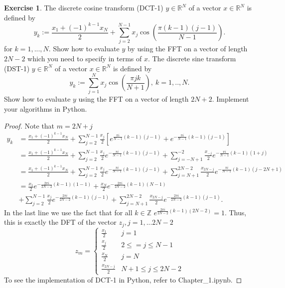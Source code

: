 \documentclass{amsart}
\theoremstyle{plain}
\theoremstyle{definition}
\newtheorem{exer}{Exercise}[section]
\newcommand{\R}{\mathbb{R}}
\newcommand{\Z}{\mathbb{Z}}
\begin{document}
\begin{exer}
    The discrete cosine transform (DCT-1) $y\in \R^N$ of a vector $x \in \R^N$ is defined by
    $$y_k := \frac{x_1 + \left(-1\right)^{k-1}x_N}{2} + \sum_{j=2}^{N-1} x_j \cos\left(\frac{\pi(k-1)(j-1)}{N-1}\right).$$
    for $k=1,...,N$. Show how to evaluate $y$ by using the FFT on a vector of length $2N-2$ which you need to specify in terms of $x$.
     The discrete sine transform (DST-1) $y\in \R^N$ of a vector $x \in \R^N$ is defined by
     $$y_k := \sum_{j=1}^{N} x_j \cos\left(\frac{\pi jk}{N+1}\right), \ k=1,..,N.$$
     Show how to evaluate $y$ using the FFT on a vector of length $2N+2$. Implement your algorithms in Python. 
\end{exer}
\begin{proof}
    Note that 
    $m=2N+j$
    \begin{align*}
        y_k &= \frac{x_1 + \left(-1\right)^{k-1}x_N}{2} + \sum_{j=2}^{N-1} \frac{x_j}{2}\left[e^{\frac{\pi i }{N-1}(k-1) (j-1) } +e^{-\frac{\pi i }{N-1}(k-1) (j-1) }\right]\\
        &= \frac{x_1 + \left(-1\right)^{k-1}x_N}{2}+ \sum_{j=2}^{N-1} \frac{x_j}{2}e^{-\frac{\pi i }{N-1}(k-1) (j-1) }+ \sum_{j=-N+1}^{-2}\frac{x_{-j}}{2}e^{-\frac{\pi i }{N-1}(k-1) (1+j) }\\
        &= \frac{x_1 + \left(-1\right)^{k-1}x_N}{2}+\sum_{j=2}^{N-1} \frac{x_j}{2}e^{-\frac{\pi i }{N-1}(k-1) (j-1) } + \sum_{j=N+1}^{2N-2}\frac{x_{2N-j}}{2}e^{-\frac{\pi i }{N-1}(k-1) (j-2N+1) } \\
        &=\frac{x_1}{2}e^{-\frac{2\pi i }{2N-2}(k-1) (1-1) }+ \frac{x_N}{2}e^{-\frac{2\pi i }{2N-2}(k-1) (N-1) }\\
        &+\sum_{j=2}^{N-1} \frac{x_j}{2}e^{-\frac{2\pi i }{2N-2}(k-1) (j-1) } + \sum_{j=N+1}^{2N-2}\frac{x_{2N-j}}{2}e^{-\frac{2\pi i }{2N-2}(k-1) (j-1) }.
    \end{align*}
    In the last line we use the fact that for all $k\in \Z$
    $e^{\frac{2\pi i}{2N-2}(k-1)(2N-2)} = 1.$
    Thus, this is exactly the DFT of the vector $z_j, j = 1,... 2N-2$ 
    $$z_{m} = \begin{cases}
        \frac{x_{1}}{2}&j=1\\
        \frac{x_j}{2}& 2\leq =j \leq N-1\\
        \frac{x_N}{2}& j = N\\
        \frac{x_{2N-j}}{2}& N+1 \leq j \leq  2N-2
    \end{cases}$$
    To see the implementation of DCT-1 in Python, refer to Chapter\_1.ipynb.
    \par 

\end{proof}
\end{document}
